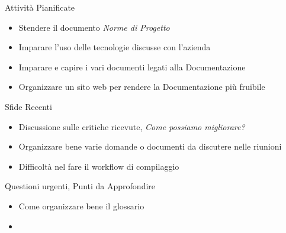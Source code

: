 \documentclass{beamer}
\begin{document}
\begin{frame}
    \begin{block}{Attività Pianificate}
        \begin{itemize}
            \item Stendere il documento \emph{Norme di Progetto} 
            \item Imparare l'uso delle tecnologie discusse con l'azienda
            \item Imparare e capire i vari documenti legati alla Documentazione
            \item Organizzare un sito web per rendere la Documentazione più fruibile
        \end{itemize}
    \end{block}
\end{frame}

\begin{frame}
    \begin{alertblock}{Sfide Recenti}
        \begin{itemize}
            \item Discussione sulle critiche ricevute, \textit{Come possiamo migliorare?}
            \item Organizzare bene varie domande o documenti da discutere nelle riunioni
            \item Difficoltà nel fare il workflow di compilaggio
        \end{itemize}
    \end{alertblock}
\end{frame}

\begin{frame}
    \begin{alertblock}{Questioni urgenti, Punti da Approfondire}
        \begin{itemize}
            \item Come organizzare bene il glossario
            \item 
        \end{itemize}
    \end{alertblock}
\end{frame}
\end{document}
